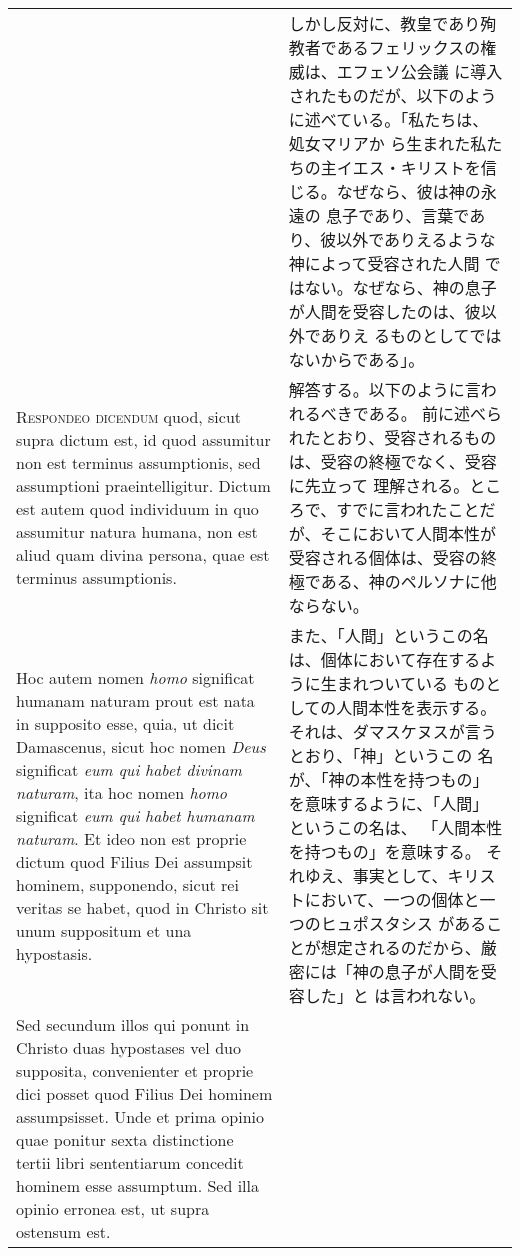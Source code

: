 \documentclass[10pt]{jsarticle} %
\begin{document}
\begin{longtable}{p{21em}p{21em}}
&

しかし反対に、教皇であり殉教者であるフェリックスの権威は、エフェソ公会議
 に導入されたものだが、以下のように述べている。「私たちは、処女マリアか
 ら生まれた私たちの主イエス・キリストを信じる。なぜなら、彼は神の永遠の
 息子であり、言葉であり、彼以外でありえるような神によって受容された人間
 ではない。なぜなら、神の息子が人間を受容したのは、彼以外でありえ
 るものとしてではないからである」。


\\



{\scshape Respondeo dicendum} quod, sicut supra dictum est, id quod assumitur non
est terminus assumptionis, sed assumptioni praeintelligitur. Dictum est
autem quod individuum in quo assumitur natura humana, non est aliud quam
divina persona, quae est terminus assumptionis. 

&

解答する。以下のように言われるべきである。
前に述べられたとおり、受容されるものは、受容の終極でなく、受容に先立って
 理解される。ところで、すでに言われたことだが、そこにおいて人間本性が受容される個体は、受容の終
 極である、神のペルソナに他ならない。

\\


Hoc autem nomen {\itshape homo}
significat humanam naturam prout est nata in supposito esse, quia, ut
dicit Damascenus, sicut hoc nomen {\itshape Deus} significat {\itshape eum qui habet divinam
naturam}, ita hoc nomen {\itshape homo} significat {\itshape eum qui habet humanam naturam}. Et
ideo non est proprie dictum quod Filius Dei assumpsit hominem,
supponendo, sicut rei veritas se habet, quod in Christo sit unum
suppositum et una hypostasis. 



&

また、「人間」というこの名は、個体において存在するように生まれついている
 ものとしての人間本性を表示する。それは、ダマスケヌスが言うとおり、「神」というこの
 名が、「神の本性を持つもの」を意味するように、「人間」というこの名は、
 「人間本性を持つもの」を意味する。
それゆえ、事実として、キリストにおいて、一つの個体と一つのヒュポスタシス
 があることが想定されるのだから、厳密には「神の息子が人間を受容した」と
 は言われない。


\\

Sed secundum illos qui ponunt in Christo
duas hypostases vel duo supposita, convenienter et proprie dici posset
quod Filius Dei hominem assumpsisset. Unde et prima opinio quae ponitur
sexta distinctione tertii libri sententiarum concedit hominem esse
assumptum. Sed illa opinio erronea est, ut supra ostensum est.



\end{longtable}
\end{document}
